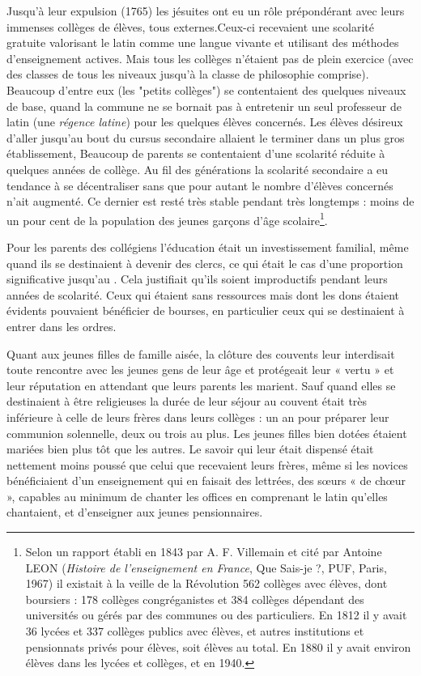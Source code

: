 Jusqu'à leur expulsion (1765) les jésuites ont eu un rôle prépondérant avec leurs immenses collèges de  élèves, tous externes.Ceux-ci recevaient une scolarité gratuite valorisant le latin comme une langue vivante et utilisant des méthodes d'enseignement actives. Mais tous les collèges n'étaient pas de plein exercice (avec des classes de tous les niveaux jusqu'à la classe de philosophie comprise). Beaucoup d'entre eux (les "petits collèges") se contentaient des quelques niveaux de base, quand la commune ne se bornait pas à entretenir un seul professeur de latin (une \emph{régence latine}) pour les quelques élèves concernés. Les élèves désireux d'aller jusqu'au bout du cursus secondaire allaient le terminer dans un plus gros établissement,  Beaucoup de parents se contentaient d'une scolarité réduite à quelques années de collège. Au fil des générations la scolarité secondaire a eu tendance à se décentraliser sans que pour autant le nombre d'élèves concernés n'ait augmenté. Ce dernier est resté très stable pendant très longtemps : moins de un pour cent de la population des jeunes garçons d'âge scolaire\footnote{Selon un rapport établi en 1843 par A. F. Villemain  et cité par Antoine LEON (\emph{Histoire de l'enseignement en France}, Que Sais-je ?, PUF, Paris, 1967) il existait à la veille de la Révolution 562 collèges avec  élèves, dont  boursiers : 178 collèges congréganistes et 384 collèges dépendant des universités ou gérés par des communes ou des particuliers. En 1812 il y avait 36 lycées et 337 collèges publics avec  élèves, et  autres institutions et pensionnats privés pour  élèves, soit  élèves au total. En 1880 il y avait environ  élèves dans les lycées et collèges, et  en 1940.}. 
 
 Pour les parents des collégiens l'éducation était un investissement familial, même quand ils se destinaient à devenir des clercs, ce qui était le cas d'une proportion significative jusqu'au . Cela justifiait qu'ils soient improductifs pendant leurs années de scolarité. Ceux qui étaient sans ressources mais dont les dons étaient évidents pouvaient bénéficier de bourses, en particulier ceux qui se destinaient à entrer dans les ordres.




Quant aux jeunes filles de famille aisée, la clôture des couvents leur interdisait toute rencontre avec les jeunes gens de leur âge et protégeait leur « vertu » et leur réputation en attendant que leurs parents les marient. Sauf quand elles se destinaient à être religieuses la durée de leur séjour au couvent était très inférieure à celle de leurs frères dans leurs collèges : un an pour préparer leur communion solennelle, deux ou trois au plus. Les jeunes filles bien dotées étaient mariées bien plus tôt que les autres. Le savoir qui leur était dispensé était nettement moins poussé que celui que recevaient leurs frères, même si les novices bénéficiaient d'un enseignement qui en faisait des lettrées, des sœurs « de chœur », capables au minimum de chanter les offices en comprenant le latin qu'elles chantaient, et d'enseigner aux jeunes pensionnaires.

